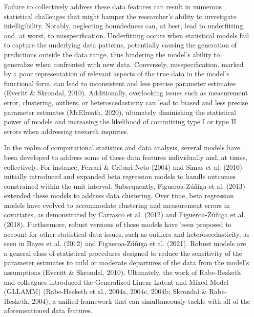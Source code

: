 \documentclass[
]{agujournal2019}
\begin{document}
Failure to collectively address these data features can result in
numerous statistical challenges that might hamper the researcher's
ability to investigate intelligibility. Notably, neglecting boundedness
can, at best, lead to underfitting and, at worst, to misspecification.
Underfitting occurs when statistical models fail to capture the
underlying data patterns, potentially causing the generation of
predictions outside the data range, thus hindering the model's ability
to generalize when confronted with new data. Conversely,
misspecification, marked by a poor representation of relevant aspects of
the true data in the model's functional form, can lead to inconsistent
and less precise parameter estimates (Everitt \& Skrondal, 2010).
Additionally, overlooking issues such as measurement error, clustering,
outliers, or heteroscedasticity can lead to biased and less precise
parameter estimates (McElreath, 2020), ultimately diminishing the
statistical power of models and increasing the likelihood of committing
type I or type II errors when addressing research inquiries.

In the realm of computational statistics and data analysis, several
models have been developed to address some of these data features
individually and, at times, collectively. For instance, Ferrari \&
Cribari-Neto (2004) and Simas et al. (2010) initially introduced and
expanded beta regression models to handle outcomes constrained within
the unit interval. Subsequently, Figueroa-Zúñiga et al. (2013) extended
these models to address data clustering. Over time, beta regression
models have evolved to accommodate clustering and measurement errors in
covariates, as demonstrated by Carrasco et al. (2012) and
Figueroa-Zúñiga et al. (2018). Furthermore, robust versions of these
models have been proposed to account for other statistical data issues,
such as outliers and heteroscedasticity, as seen in Bayes et al. (2012)
and Figueroa-Zúñiga et al. (2021). Robust models are a general class of
statistical procedures designed to reduce the sensitivity of the
parameter estimates to mild or moderate departures of the data from the
model's assumptions (Everitt \& Skrondal, 2010). Ultimately, the work of
Rabe-Hesketh and colleagues introduced the Generalized Linear Latent and
Mixed Model (GLLAMM) (Rabe-Hesketh et al., 2004a, 2004c, 2004b; Skrondal
\& Rabe-Hesketh, 2004), a unified framework that can simultaneously
tackle with all of the aforementioned data features.
\end{document}
